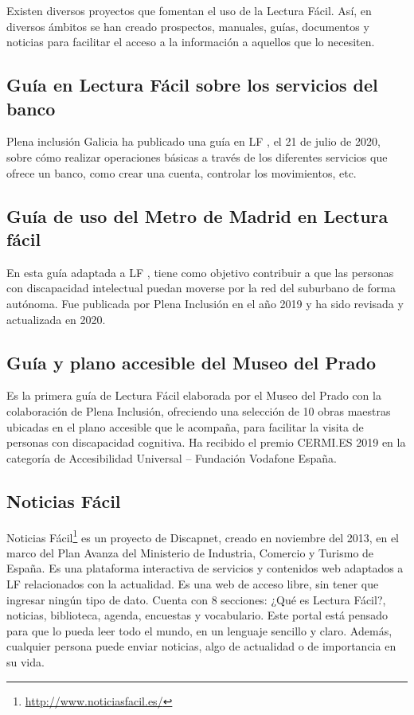 Existen diversos proyectos que fomentan el uso de la Lectura Fácil. Así, en diversos ámbitos se han creado prospectos, manuales, guías, documentos y noticias para facilitar el acceso a la información a aquellos que lo necesiten. 


\subsection{Guía en Lectura Fácil sobre los servicios del banco}



Plena inclusión Galicia ha publicado una guía en LF \citep{GuiaBanco}, el 21 de julio de 2020, sobre cómo realizar operaciones básicas a través de los diferentes servicios que ofrece un banco, como crear una cuenta, controlar los movimientos, etc.

\subsection{Guía de uso del Metro de Madrid en Lectura fácil}


En esta guía adaptada a LF \citep{GuiaMetro}, tiene como objetivo contribuir a que las personas con discapacidad intelectual puedan moverse por la red del suburbano de forma autónoma. Fue publicada por Plena Inclusión en el año 2019 y ha sido revisada y actualizada en 2020. 

\subsection{Guía y plano accesible del Museo del Prado} 
Es la primera guía  de Lectura Fácil \citep{GuiaMuseo} elaborada por el Museo del Prado con la colaboración de Plena Inclusión, ofreciendo una selección de 10 obras maestras ubicadas en el plano accesible \citep{plano} que le acompaña, para facilitar la visita de personas con discapacidad cognitiva. Ha recibido el premio CERMI.ES 2019 en la categoría de Accesibilidad Universal – Fundación Vodafone España.

\subsection{Noticias Fácil} 
Noticias Fácil\footnote{\href{http://www.noticiasfacil.es/}{http://www.noticiasfacil.es/}} es un proyecto de Discapnet, creado en noviembre del 2013, en el marco del Plan Avanza del Ministerio de Industria, Comercio y Turismo de España. Es una plataforma interactiva de servicios y contenidos web adaptados a LF relacionados con la actualidad. Es una web de acceso libre, sin tener que ingresar ningún tipo de dato. Cuenta con 8 secciones: ¿Qué es Lectura Fácil?, noticias, biblioteca, agenda, encuestas y vocabulario. Este portal está pensado para que lo pueda leer todo el mundo, en un lenguaje sencillo y claro. Además, cualquier persona puede enviar noticias, algo de actualidad o de importancia en su vida.

